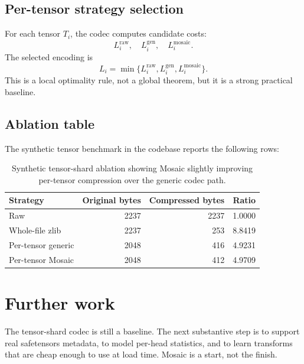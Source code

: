 \documentclass[11pt]{article}
\begin{document}
\subsection{Per-tensor strategy selection}
For each tensor $T_i$, the codec computes candidate costs:
\[
L_i^{\text{raw}},\quad L_i^{\text{gen}},\quad L_i^{\text{mosaic}}.
\]
The selected encoding is
\[
L_i = \min\{L_i^{\text{raw}}, L_i^{\text{gen}}, L_i^{\text{mosaic}}\}.
\]
This is a local optimality rule, not a global theorem, but it is a strong practical baseline.

\subsection{Ablation table}
The synthetic tensor benchmark in the codebase reports the following rows:

\begin{table}[h]
\centering
\begin{tabular}{l r r r}
\toprule
Strategy & Original bytes & Compressed bytes & Ratio \\
\midrule
Raw & 2237 & 2237 & 1.0000 \\
Whole-file zlib & 2237 & 253 & 8.8419 \\
Per-tensor generic & 2048 & 416 & 4.9231 \\
Per-tensor Mosaic & 2048 & 412 & 4.9709 \\
\bottomrule
\end{tabular}
\caption{Synthetic tensor-shard ablation showing Mosaic slightly improving per-tensor compression over the generic codec path.}
\end{table}

\section{Further work}
The tensor-shard codec is still a baseline. The next substantive step is to support real safetensors metadata, to model per-head statistics, and to learn transforms that are cheap enough to use at load time. Mosaic is a start, not the finish.
\end{document}
